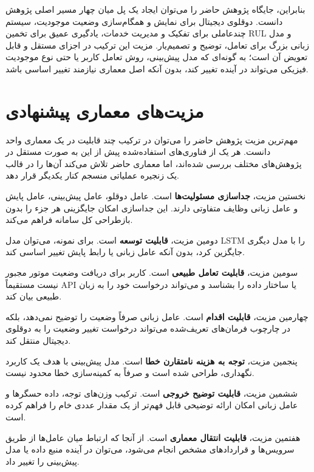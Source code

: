 بنابراین، جایگاه پژوهش حاضر را می‌توان ایجاد یک پل میان چهار مسیر
اصلی پژوهش دانست. دوقلوی دیجیتال برای نمایش و همگام‌سازی وضعیت
موجودیت، سیستم چندعاملی برای تفکیک و مدیریت خدمات، یادگیری عمیق برای
تخمین \gls{RUL} و مدل زبانی بزرگ برای تعامل، توضیح و تصمیم‌یار. مزیت این ترکیب در اجزای مستقل و قابل تعویض آن است؛ به گونه‌ای که مدل پیش‌بینی، روش تعامل کاربر یا حتی نوع موجودیت فیزیکی می‌تواند در آینده تغییر کند، بدون آنکه اصل معماری نیازمند تغییر اساسی باشد.




\section{مزیت‌های معماری پیشنهادی}
\label{sec:architecture-benefits}

مهم‌ترین مزیت پژوهش حاضر را می‌توان در ترکیب چند قابلیت در یک معماری واحد دانست. هر یک از فناوری‌های استفاده‌شده پیش از این به صورت مستقل در پژوهش‌های مختلف بررسی شده‌اند، اما معماری حاضر تلاش می‌کند آن‌ها را در قالب یک زنجیره عملیاتی منسجم کنار یکدیگر قرار دهد.

نخستین مزیت، \textbf{جداسازی مسئولیت‌ها} است. عامل دوقلو، عامل پیش‌بینی، عامل پایش و عامل زبانی وظایف متفاوتی دارند. این جداسازی امکان جایگزینی هر جزء را بدون بازطراحی کل سامانه فراهم می‌کند.

دومین مزیت، \textbf{قابلیت توسعه} است. برای نمونه، می‌توان مدل LSTM را با مدل دیگری جایگزین کرد، بدون آنکه عامل زبانی یا رابط پایش تغییر اساسی کند.

سومین مزیت، \textbf{قابلیت تعامل طبیعی} است. کاربر برای دریافت وضعیت موتور مجبور نیست مستقیماً API یا ساختار داده را بشناسد و می‌تواند درخواست خود را به زبان طبیعی بیان کند.

چهارمین مزیت، \textbf{قابلیت اقدام} است. عامل زبانی صرفاً وضعیت را توضیح نمی‌دهد، بلکه در چارچوب فرمان‌های تعریف‌شده می‌تواند درخواست تغییر وضعیت را به دوقلوی دیجیتال منتقل کند.

پنجمین مزیت، \textbf{توجه به هزینه نامتقارن خطا} است. مدل پیش‌بینی با هدف یک کاربرد نگهداری، طراحی شده است و صرفاً به کمینه‌سازی خطا محدود نیست.

ششمین مزیت، \textbf{قابلیت توضیح خروجی} است. ترکیب وزن‌های توجه، داده حسگرها و عامل زبانی امکان ارائه توضیحی قابل فهم‌تر از یک مقدار عددی خام را فراهم کرده است.

هفتمین مزیت، \textbf{قابلیت انتقال معماری} است. از آنجا که ارتباط میان عامل‌ها از طریق سرویس‌ها و قراردادهای مشخص انجام می‌شود، می‌توان در آینده منبع داده یا مدل پیش‌بینی را تغییر داد.




